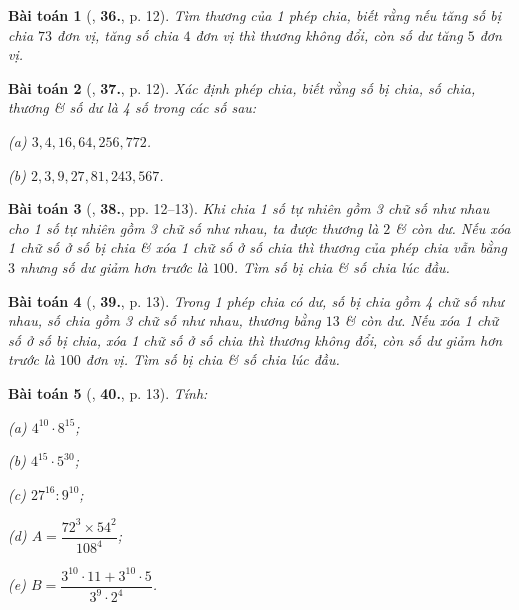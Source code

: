 \documentclass[oneside]{book}
\numberwithin{equation}{section}
\newtheorem{baitoan}{Bài toán}[section]
\begin{document}
\begin{baitoan}[\cite{Binh_Toan_6_tap_1}, \textbf{36.}, p. 12]
	Tìm thương của 1 phép chia, biết rằng nếu tăng số bị chia $73$ đơn vị, tăng số chia $4$ đơn vị thì thương không đổi, còn số dư tăng $5$ đơn vị.
\end{baitoan}

\begin{baitoan}[\cite{Binh_Toan_6_tap_1}, \textbf{37.}, p. 12]
	Xác định phép chia, biết rằng số bị chia, số chia, thương \& số dư là 4 số trong các số sau:
	\begin{enumerate*}
		\item[(a)] $3,4,16,64,256,772$.
		\item[(b)] $2,3,9,27,81,243,567$.
	\end{enumerate*}
\end{baitoan}

\begin{baitoan}[\cite{Binh_Toan_6_tap_1}, \textbf{38.}, pp. 12--13]
	Khi chia 1 số tự nhiên gồm 3 chữ số như nhau cho 1 số tự nhiên gồm 3 chữ số như nhau, ta được thương là $2$ \& còn dư. Nếu xóa 1 chữ số ở số bị chia \& xóa 1 chữ số ở số chia thì thương của phép chia vẫn bằng $3$ nhưng số dư giảm hơn trước là $100$. Tìm số bị chia \& số chia lúc đầu.
\end{baitoan}

\begin{baitoan}[\cite{Binh_Toan_6_tap_1}, \textbf{39.}, p. 13]
	Trong 1 phép chia có dư, số bị chia gồm 4 chữ số như nhau, số chia gồm 3 chữ số như nhau, thương bằng $13$ \& còn dư. Nếu xóa 1 chữ số ở số bị chia, xóa 1 chữ số ở số chia thì thương không đổi, còn số dư giảm hơn trước là $100$ đơn vị. Tìm số bị chia \& số chia lúc đầu.
\end{baitoan}

\begin{baitoan}[\cite{Binh_Toan_6_tap_1}, \textbf{40.}, p. 13]
	Tính:\\
	\begin{enumerate*}
		\item[(a)] $4^{10}\cdot 8^{15}$;
		\item[(b)] $4^{15}\cdot 5^{30}$;
		\item[(c)] $27^{16}:9^{10}$;
		\item[(d)] $A = \dfrac{72^3\times 54^2}{108^4}$;
		\item[(e)] $B = \dfrac{3^{10}\cdot 11 + 3^{10}\cdot 5}{3^9\cdot 2^4}$.
	\end{enumerate*}
\end{baitoan}
\end{document}
